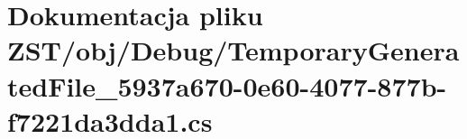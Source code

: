 \hypertarget{_temporary_generated_file__5937a670-0e60-4077-877b-f7221da3dda1_8cs}{}\section{Dokumentacja pliku Z\+S\+T/obj/\+Debug/\+Temporary\+Generated\+File\+\_\+5937a670-\/0e60-\/4077-\/877b-\/f7221da3dda1.cs}
\label{_temporary_generated_file__5937a670-0e60-4077-877b-f7221da3dda1_8cs}
